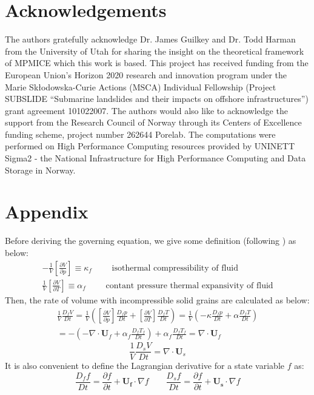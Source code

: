 \documentclass[preprint,12pt]{elsarticle}
\begin{document}
\section{\textsf{Acknowledgements}}
The authors gratefully acknowledge Dr. James Guilkey and Dr. Todd Harman from the University of Utah for sharing the insight on the theoretical framework of MPMICE which this work is based. This project has received funding from the European Union’s Horizon 2020 research and innovation program under the Marie Skłodowska-Curie Actions (MSCA) Individual Fellowship (Project SUBSLIDE “Submarine landslides and their impacts on offshore infrastructures”) grant agreement 101022007. The authors would also like to acknowledge the support from the Research Council of Norway through its Centers of Excellence funding scheme, project number 262644 Porelab. The computations were performed on High Performance Computing resources provided by UNINETT Sigma2 - the National Infrastructure for High Performance Computing and Data Storage in Norway.


\section{\textsf{Appendix}}
%
%
Before deriving the governing equation, we give some definition (following \cite{Kashiwa}) as below:
%
%
\begin{gather}
-\frac{1}{V} \left[ \frac{\partial V}{\partial p} \right] \equiv \kappa_f \qquad \mbox{ isothermal compressibility of fluid} \\
\frac{1}{V} \left[ \frac{\partial V}{\partial T} \right] \equiv \alpha_f \qquad \mbox{ contant pressure thermal expansivity of fluid}
\end{gather}
%
%
Then, the rate of volume with incompressible solid grains are calculated as below:
%
%
\begin{equation}
\label{fluidvolumerate}
\begin{gathered}
   \frac{1}{V} \frac{D_f V}{Dt} = \frac{1}{V} \left( \left[ \frac{\partial V}{\partial p} \right] \frac{D_f p}{D t} + \left[ \frac{\partial V}{\partial T} \right] \frac{D_f T}{D t} \right) = \frac{1}{V} \left( -\kappa \frac{D_f p}{D t} + \alpha \frac{D_f T}{D t} \right) \\
   = -(-\nabla \cdot \pmb{U}_f + \alpha_f \frac{D_f T_f}{Dt}) + \alpha_f \frac{D_f T_f}{Dt} = \nabla \cdot \pmb{U}_f
\end{gathered}
\end{equation}
%
%
\begin{equation}
\label{solidvolumerate}
 \frac{1}{V} \frac{D_s V}{D t} = \nabla \cdot \pmb{U}_s
\end{equation}
%
%
It is also convenient to define the Lagrangian derivative for a state variable $f$ as:
%
%
\begin{equation}
\frac{D_f f}{Dt} =  \frac{\partial f}{\partial t} + \pmb{U_f} \cdot \nabla f \qquad
\frac{D_s f}{Dt} =  \frac{\partial f}{\partial t} + \pmb{U_s} \cdot \nabla f
\end{equation}
%
%
\end{document}
